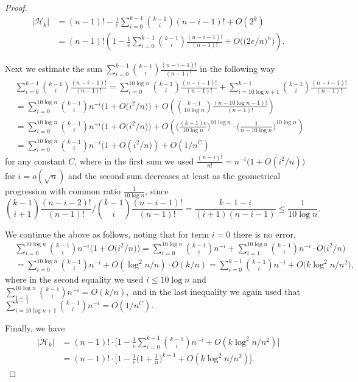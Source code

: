 \documentclass[11pt]{extarticle}
\numberwithin{equation}{section} %
\theoremstyle{plain}
\theoremstyle{definition}
\newcommand{\m}{\mathcal}
\begin{document}
\begin{proof}
    
    \begin{align*}
    |\m H_k| &= (n-1)! - \frac 1e\sum_{i = 0}^{k-1} {k-1 \choose i} (n-i-1)! +O(2^k)\\
    &= (n-1)!\left( 1 - \frac 1e\sum_{i = 0}^{k-1} {k-1 \choose i} \frac{(n-i-1)!}{(n-1)!} + O\Big(\big( 2e/n \big)^n\Big)  \right).
    \end{align*}

    Next we estimate the sum $\sum_{i = 0}^{k-1} {k-1 \choose i} \frac{(n-i-1)!}{(n-1)!}$ in the following way
    \begin{align*}
    & \sum_{i = 0}^{k-1} {k-1 \choose i} \frac{(n-i-1)!}{(n-1)!} = \sum_{i = 0}^{10\log{n}} {k-1 \choose i} \frac{(n-i-1)!}{(n-1)!} + \sum_{i = 10\log{n}+1}^{k-1} {k-1 \choose i} \frac{(n-i-1)!}{(n-1)!}\\
     & = \sum_{i = 0}^{10\log{n}} {k-1 \choose i} n^{-i}\Big( 1+O\Big(i^2/n\Big) \Big) + O\left( {k-1 \choose 10\log{n}}\frac{(n-10\log{n}-1)!}{(n-1)!} \right) \\
     & = \sum_{i = 0}^{10\log{n}} {k-1 \choose i} n^{-i}\Big( 1+O\Big(i^2/n\Big) \Big) + O\left( \Big(\frac{(k-1)e}{10\log{n}}\Big)^{10\log{n}}\cdot \Big(\frac{1}{n-10\log{n}}\Big)^{10\log{n}} \right)  \\ 
     & = \sum_{i = 0}^{10\log{n}} {k-1 \choose i} n^{-i}\Big( 1+O\left(i^2/n\Big) \right) + O\left(1/n^C\right)
    \end{align*}
    for any constant $C$, where in the first sum we used $\frac{(n-i)!}{n!} = n^{-i}\Big( 1 + O(i^2/n) \Big)$ for $i=o(\sqrt{n})$ and the second sum decreases at least as the geometrical progression with common ratio $\frac{1}{10\log{n}}$, since 
    $$
    {k-1 \choose i+1} \frac{(n-i-2)!}{(n-1)!} / {k-1 \choose i} \frac{(n-i-1)!}{(n-1)!} = \frac{k-1-i}{(i+1)(n-i-1)}\leq \frac{1}{10\log{n}}.
    $$

    We continue the above as follows, noting that for term $i=0$ there is no error, 
    \begin{align*}
    &  \sum_{i = 0}^{10\log{n}} {k-1 \choose i} n^{-i}\Big( 1+O\Big(i^2/n\Big) \Big) = \sum_{i = 0}^{10\log{n}} {k-1 \choose i} n^{-i}+\sum_{i = 1}^{10\log{n}} {k-1 \choose i} n^{-i}\cdot O\Big(i^2/n\Big) \\
    & = \sum_{i = 0}^{10\log{n}} {k-1 \choose i} n^{-i}+O(\log^2{n}/n)\cdot O(k/n) = \sum_{i = 0}^{k-1} {k-1 \choose i} n^{-i} + O\Big(k\log^2{n}/n^2\Big),
    \end{align*}
    where in the second equality we used $i\leq 10\log{n}$ and $\sum_{i = 1}^{10\log{n}} {k-1 \choose i} n^{-i} = O(k/n),$ and in the last inequality we again used that $\sum_{i = 10\log{n}+1}^{k-1} {k-1 \choose i} n^{-i} = O(1/n^C).$

    Finally, we have 
    \begin{align*}
    |\m H_k| &=  (n-1)!\cdot\Big[1-\frac 1e\sum_{i = 0}^{k-1} {k-1 \choose i} n^{-i}+O(k\log^2 n/n^2)\Big]\\
    &= (n-1)!\cdot\Big[1-\frac 1e\Big(1+\frac 1n\Big)^{k-1}+O(k\log^2 n/n^2)\Big]. 
    \end{align*}
\end{proof}
\end{document}
